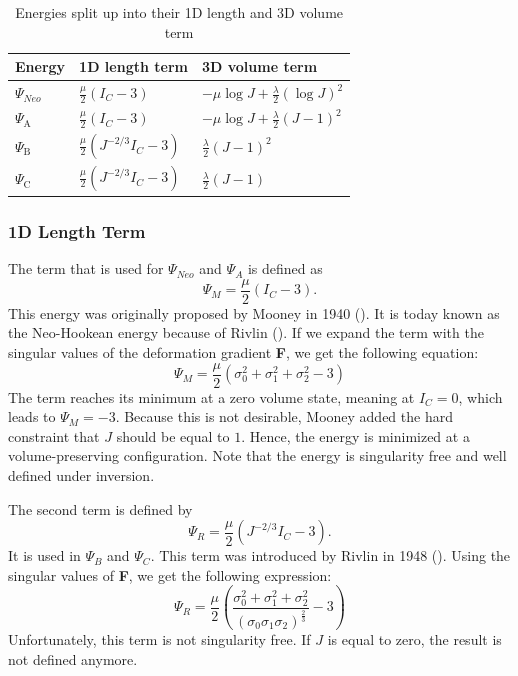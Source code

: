 {{\setlength{\tabcolsep}{0.5em} %
{\renewcommand{\arraystretch}{1.3}%
\begin{table}[!htbp]
\centering
    \begin{tabular}{ | l | l | l |}
    \hline
    \textbf{Energy} & \textbf{1D length term} & \textbf{3D volume term} \\ \hline
    $\Psi_{Neo}$ & $\frac{\mu}{2}\left(I_{C}-3\right)$ & $-\mu \log J+\frac{\lambda}{2}(\log J)^{2}$ \\ \hline
    $\Psi_{\mathrm{A}}$ & $\frac{\mu}{2}\left(I_{C}-3\right)$ & $-\mu \log J+\frac{\lambda}{2}(J-1)^{2}$ \\ \hline
    $\Psi_{\mathrm{B}}$ & $\frac{\mu}{2}\left(J^{-2 / 3} I_{C}-3\right)$ & $\frac{\lambda}{2}(J-1)^{2}$ \\ \hline
    $\Psi_{\mathrm{C}}$ & $\frac{\mu}{2}\left(J^{-2 / 3} I_{C}-3\right)$ & $\frac{\lambda}{2}(J-1)$ \\ \hline
    \end{tabular}
    \caption{Energies split up into their 1D length and 3D volume term}
\label{table:energies_split}
\end{table}

\subsubsection{1D Length Term}
The term that is used for $\Psi_{Neo}$ and $\Psi_{A}$ is defined as
\[
\Psi_{M}=\frac{\mu}{2}\left(I_{C}-3\right).
\]
This energy was originally proposed by Mooney in 1940 (\cite{mooney1940theory}). It is today known as the Neo-Hookean energy because of Rivlin (\cite{rivlin1948large}). If we expand the term with the singular values of the deformation gradient \textbf{F}, we get the following equation:
\[
\Psi_{M}=\frac{\mu}{2}\left(\sigma_{0}^2 + \sigma_{1}^2 + \sigma_{2}^2 - 3\right)
\]
The term reaches its minimum at a zero volume state, meaning at $I_{C}=0$, which leads to $\Psi_{M}=-3$. Because this is not desirable, Mooney added the hard constraint that $J$ should be equal to $1$. Hence, the energy is minimized at a volume-preserving configuration. Note that the energy is singularity free and well defined under inversion.

The second term is defined by
\[
\Psi_{R} = \frac{\mu}{2}\left(J^{-2 / 3} I_{C}-3\right).
\]
It is used in $\Psi_{B}$ and $\Psi_{C}$. This term was introduced by Rivlin in 1948 (\cite{rivlin1948large}). Using the singular values of \textbf{F}, we get the following expression:
\[
\Psi_{R} = \frac{\mu}{2}\left(\frac{\sigma_{0}^2 + \sigma_{1}^2 + \sigma_{2}^2}{(\sigma_{0}  \sigma_{1}  \sigma_{2})^\frac{2}{3}}
 - 3\right)
\]
Unfortunately, this term is not singularity free. If $J$ is equal to zero, the result is not defined anymore.

}}}
